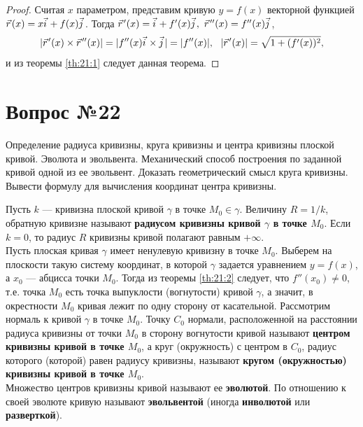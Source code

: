 \documentclass[12pt]{report}
\numberwithin{equation}{section}
\newcommand{\pvec}[1]{\vec{#1}\mkern2mu\vphantom{#1}}
\begin{document}
\begin{proof}
Считая $x$ параметром, представим кривую $y = f(x)$ векторной функцией $\pvec{r}(x) = x \pvec{i} + f(x) \pvec{j}$. Тогда $\pvec{r}'(x) = \pvec{i} + f'(x) \pvec{j},~\pvec{r}''(x) = f''(x)\pvec{j}$,
\[ |\pvec{r}'(x) \times \pvec{r}''(x)| = |f''(x) \pvec{i} \times \pvec{j}| = |f''(x)|,~~ |\pvec{r}'(x)| = \sqrt{1 + (f'(x))^2},\]
и из теоремы \ref{th:21:1} следует данная теорема.
\end{proof}

\newpage \section{Вопрос №22} %
\begin{framed}
Определение радиуса кривизны, круга кривизны и центра кривизны плоской кривой. Эволюта и эвольвента. Механический способ построения по заданной кривой одной из ее эвольвент. Доказать геометрический смысл круга кривизны. Вывести формулу для вычисления
координат центра кривизны.
\end{framed}

Пусть $k$ --- кривизна плоской кривой $\gamma$ в точке $M_0 \in \gamma$. Величину $R = 1 / k$, обратную кривизне называют \textbf{радиусом кривизны кривой $\gamma$ в точке $M_0$}. Если $k = 0$, то радиус $R$ кривизны кривой полагают равным $+\infty$.\\

Пусть плоская кривая $\gamma$ имеет ненулевую кривизну в точке $M_0$. Выберем на плоскости такую систему координат, в которой $\gamma$ задается уравнением $y = f(x)$, а $x_0$ --- абцисса точки $M_0$. Тогда из теоремы \ref{th:21:2} следует, что $f''(x_0) \neq 0$, т.е. точка $M_0$ есть точка выпуклости (вогнутости) кривой $\gamma$, а значит, в окрестности $M_0$ кривая лежит по одну сторону от касательной. Рассмотрим нормаль к кривой $\gamma$ в точке $M_0$. Точку $C_0$ нормали, расположенной на расстоянии радиуса кривизны от точки $M_0$ в сторону вогнутости кривой называют \textbf{центром кривизны кривой в точке $M_0$}, а круг (окружность) с центром в $C_0$, радиус которого (которой) равен радиусу кривизны, называют \textbf{кругом (окружностью) кривизны кривой в точке $M_0$}.\\

Множество центров кривизны кривой называют ее \textbf{эволютой}. По отношению к своей эволюте кривую называют \textbf{эвольвентой} (иногда \textbf{инволютой} или \textbf{разверткой}).
\end{document}
